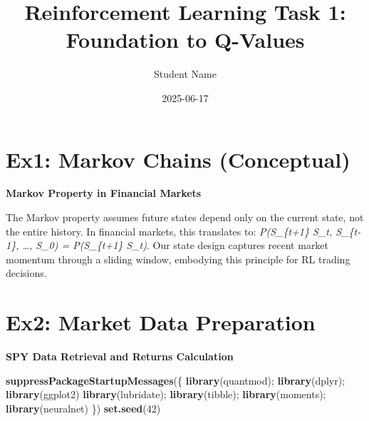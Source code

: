 \documentclass[
]{article}
\title{Reinforcement Learning Task 1: Foundation to Q-Values}
\author{Student Name}
\date{2025-06-17}
\newenvironment{Shaded}{\begin{snugshade}}{\end{snugshade}}
\newcommand{\DecValTok}[1]{\textcolor[rgb]{0.00,0.00,0.81}{#1}}
\newcommand{\FunctionTok}[1]{\textcolor[rgb]{0.13,0.29,0.53}{\textbf{#1}}}
\newcommand{\NormalTok}[1]{#1}
\begin{document}
\maketitle

{
\setcounter{tocdepth}{2}
\tableofcontents
}
\hypertarget{ex1-markov-chains-conceptual}{%
\section{Ex1: Markov Chains
(Conceptual)}\label{ex1-markov-chains-conceptual}}

\textbf{Markov Property in Financial Markets}

The Markov property assumes future states depend only on the current
state, not the entire history. In financial markets, this translates to:
\emph{P(S\_\{t+1\} \textbar{} S\_t, S\_\{t-1\}, \ldots, S\_0) =
P(S\_\{t+1\} \textbar{} S\_t)}. Our state design captures recent market
momentum through a sliding window, embodying this principle for RL
trading decisions.

\hypertarget{ex2-market-data-preparation}{%
\section{Ex2: Market Data
Preparation}\label{ex2-market-data-preparation}}

\textbf{SPY Data Retrieval and Returns Calculation}

\begin{Shaded}
\begin{Highlighting}[]
\FunctionTok{suppressPackageStartupMessages}\NormalTok{(\{}
  \FunctionTok{library}\NormalTok{(quantmod); }\FunctionTok{library}\NormalTok{(dplyr); }\FunctionTok{library}\NormalTok{(ggplot2)}
  \FunctionTok{library}\NormalTok{(lubridate); }\FunctionTok{library}\NormalTok{(tibble); }\FunctionTok{library}\NormalTok{(moments); }\FunctionTok{library}\NormalTok{(neuralnet)}
\NormalTok{\})}
\FunctionTok{set.seed}\NormalTok{(}\DecValTok{42}\NormalTok{)}
\end{Highlighting}
\end{Shaded}
\end{document}
